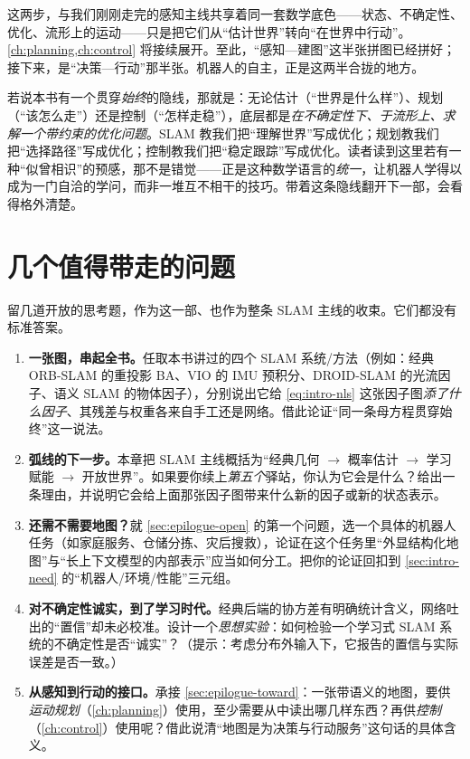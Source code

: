 \noindent 这两步，与我们刚刚走完的感知主线共享着同一套数学底色——状态、不确定性、优化、流形上的运动——只是把它们从“估计世界”转向“在世界中行动”。\cref{ch:planning,ch:control} 将接续展开。至此，“感知—建图”这半张拼图已经拼好；接下来，是“决策—行动”那半张。机器人的自主，正是这两半合拢的地方。

\begin{insight}
若说本书有一个贯穿\emph{始终}的隐线，那就是：无论估计（“世界是什么样”）、规划（“该怎么走”）还是控制（“怎样走稳”），底层都是\emph{在不确定性下、于流形上、求解一个带约束的优化问题}。SLAM 教我们把“理解世界”写成优化；规划教我们把“选择路径”写成优化；控制教我们把“稳定跟踪”写成优化。读者读到这里若有一种“似曾相识”的预感，那不是错觉——正是这种数学语言的\emph{统一}，让机器人学得以成为一门自洽的学问，而非一堆互不相干的技巧。带着这条隐线翻开下一部，会看得格外清楚。
\end{insight}

\section*{几个值得带走的问题}
留几道开放的思考题，作为这一部、也作为整条 SLAM 主线的收束。它们都没有标准答案。

\begin{enumerate}
  \item \textbf{一张图，串起全书。}\;任取本书讲过的四个 SLAM 系统/方法（例如：经典 ORB-SLAM 的重投影 BA、VIO 的 IMU 预积分、DROID-SLAM 的光流因子、语义 SLAM 的物体因子），分别说出它给 \cref{eq:intro-nls} 这张因子图\emph{添了什么因子}、其残差与权重各来自手工还是网络。借此论证“同一条母方程贯穿始终”这一说法。
  \item \textbf{弧线的下一步。}\;本章把 SLAM 主线概括为“经典几何 $\to$ 概率估计 $\to$ 学习赋能 $\to$ 开放世界”。如果要你续上\emph{第五个}驿站，你认为它会是什么？给出一条理由，并说明它会给上面那张因子图带来什么新的因子或新的状态表示。
  \item \textbf{还需不需要地图？}\;就 \cref{sec:epilogue-open} 的第一个问题，选一个具体的机器人任务（如家庭服务、仓储分拣、灾后搜救），论证在这个任务里“外显结构化地图”与“长上下文模型的内部表示”应当如何分工。把你的论证回扣到 \cref{sec:intro-need} 的“机器人/环境/性能”三元组。
  \item \textbf{对不确定性诚实，到了学习时代。}\;经典后端的协方差有明确统计含义，网络吐出的“置信”却未必校准。设计一个\emph{思想实验}：如何检验一个学习式 SLAM 系统的不确定性是否“诚实”？（提示：考虑分布外输入下，它报告的置信与实际误差是否一致。）
  \item \textbf{从感知到行动的接口。}\;承接 \cref{sec:epilogue-toward}：一张带语义的地图，要供\emph{运动规划}（\cref{ch:planning}）使用，至少需要从中读出哪几样东西？再供\emph{控制}（\cref{ch:control}）使用呢？借此说清“地图是为决策与行动服务”这句话的具体含义。
\end{enumerate}

